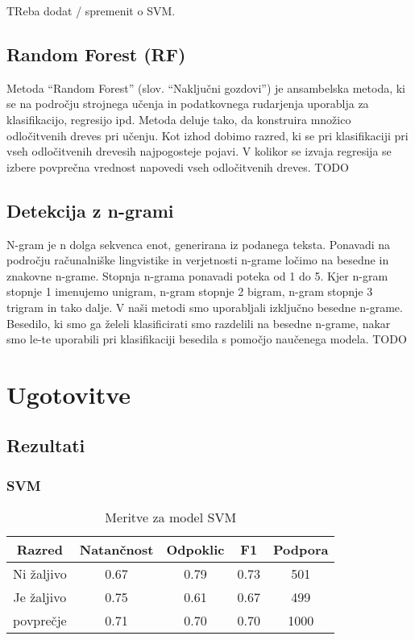 \documentclass{acm_proc_article-sp}
\begin{document}
TReba dodat / spremenit o SVM.



\subsection{Random Forest (RF)}
Metoda “Random Forest” (slov. “Naključni gozdovi”) je ansambelska metoda, ki se na področju strojnega učenja in podatkovnega rudarjenja uporablja za klasifikacijo, regresijo ipd. Metoda deluje tako, da konstruira množico odločitvenih dreves pri učenju. Kot izhod dobimo razred, ki se pri klasifikaciji pri vseh odločitvenih drevesih najpogosteje pojavi. V kolikor se izvaja regresija se izbere povprečna vrednost napovedi vseh odločitvenih dreves. TODO

\subsection{Detekcija z n-grami}
N-gram je n dolga sekvenca enot, generirana iz podanega teksta.
Ponavadi na področju računalniške lingvistike in verjetnosti n-grame ločimo na besedne in znakovne n-grame. Stopnja n-grama ponavadi poteka od 1 do 5. Kjer n-gram stopnje 1 imenujemo unigram, n-gram stopnje 2 bigram, n-gram stopnje 3 trigram in tako dalje. 
V naši metodi smo uporabljali izključno besedne n-grame. 
Besedilo, ki smo ga želeli klasificirati smo razdelili na besedne n-grame, nakar smo le-te uporabili pri klasifikaciji besedila s pomočjo naučenega modela. TODO

\section{Ugotovitve}
\subsection{Rezultati}
\subsubsection{SVM}
\begin{table}[h!]
	\centering
	\caption{Meritve za model SVM}
	\begin{tabular}{|c|c|c|c|c|}
		\hline
		\textbf{Razred} & \textbf{Natančnost} & \textbf{Odpoklic} & \textbf{F1} & \textbf{Podpora} \\ \hline
		Ni žaljivo & 0.67 & 0.79 & 0.73 & 501 \\ \hline
		Je žaljivo & 0.75 & 0.61 & 0.67 & 499 \\ \hline \hline
		povprečje & 0.71 & 0.70 & 0.70 & 1000 \\ \hline
	\end{tabular}
\end{table}
\end{document}
